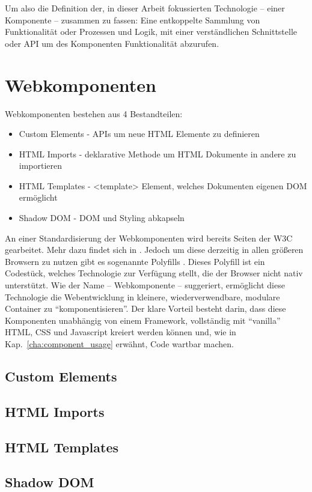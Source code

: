 Um also die Definition der, in dieser Arbeit fokussierten Technologie -- einer Komponente -- zusammen zu fassen: Eine entkoppelte Sammlung von Funktionalität oder Prozessen und Logik, mit einer verständlichen Schnittstelle oder API um des Komponenten Funktionalität abzurufen.

\section{Webkomponenten}
Webkomponenten bestehen aus 4 Bestandteilen:
\begin{itemize}
	\item Custom Elements - APIs um neue HTML Elemente zu definieren
	\item HTML Imports - deklarative Methode um HTML Dokumente in andere zu importieren
	\item HTML Templates - <template> Element, welches Dokumenten eigenen DOM ermöglicht
	\item Shadow DOM - DOM und Styling abkapseln
\end{itemize}
An einer Standardisierung der Webkomponenten wird bereits Seiten der W3C gearbeitet. Mehr dazu findet sich in \cite{w3c-components}. Jedoch um diese derzeitig in allen größeren Browsern zu nutzen gibt es sogenannte Polyfills \cite{polyfill}. Dieses Polyfill ist ein Codestück, welches Technologie zur Verfügung stellt, die der Browser nicht nativ unterstützt.
Wie der Name -- Webkomponente -- suggeriert, ermöglicht diese Technologie die Webentwicklung in kleinere, wiederverwendbare, modulare Container zu "`komponentisieren"'.  Der klare Vorteil besteht darin, dass diese Komponenten unabhängig von einem Framework, vollständig mit "`vanilla"' HTML, CSS und Javascript kreiert werden können und, wie in Kap.~\ref{cha:component_usage} erwähnt, Code wartbar machen.

\subsection{Custom Elements}
\subsection{HTML Imports}
\subsection{HTML Templates}
\subsection{Shadow DOM}

